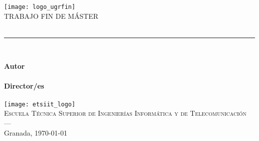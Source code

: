 \begin{titlepage}

\newlength{\centeroffset}
\setlength{\centeroffset}{-0.5\oddsidemargin}
\addtolength{\centeroffset}{0.5\evensidemargin}
\thispagestyle{empty}

\noindent\hspace*{\centeroffset}\begin{minipage}{\textwidth}

\centering
\texttt{[image: logo\_ugrfin]}\\[1.4cm]

\textsc{ \Large TRABAJO FIN DE MÁSTER\\[0.2cm]}
% 
{\Huge\bfseries \tituloTFM \\ }
\noindent\rule[-1ex]{\textwidth}{3pt}\\[3.5ex]
{\fontsize{16pt}{18pt}\bfseries \subtituloTFM}
\end{minipage}

\vspace{0.5cm}
\noindent\hspace*{\centeroffset}\begin{minipage}{\textwidth}
\centering

\textbf{Autor}\\ {\estudiante}\\[2.5ex]
\textbf{Director/es}\\
{
    \ifthenelse{\equal{\tutorB}{}}{
      \tutorA
  }{
      \tutorA\\
      \tutorB
  }
}\\[2cm]

\texttt{[image: etsiit\_logo]}\\[0.1cm]
\textsc{Escuela Técnica Superior de Ingenierías Informática y de Telecomunicación}\\
\textsc{---}\\
Granada, \today
\end{minipage}
\end{titlepage}


